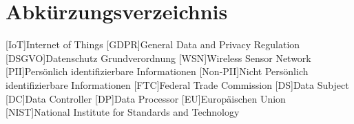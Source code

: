 
\section*{Abkürzungsverzeichnis}

\begin{acronym}[IoT]

[IoT]{Internet of Things}
[GDPR]{General Data and Privacy Regulation}
[DSGVO]{Datenschutz Grundverordnung}
[WSN]{Wireless Sensor Network}
[PII]{Persönlich identifizierbare Informationen}
[Non-PII]{Nicht Persönlich identifizierbare Informationen}
[FTC]{Federal Trade Commission}
[DS]{Data Subject}
[DC]{Data Controller}
[DP]{Data Processor}
[EU]{Europäischen Union}
[NIST]{National Institute for Standards and Technology}

\end{acronym}